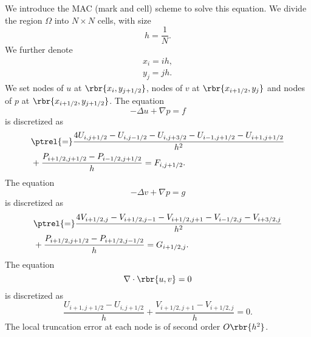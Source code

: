 \documentclass[english, nochinese]{pnote}
\begin{document}
We introduce the MAC (mark and cell) scheme to solve this equation. We divide the region $\Omega$ into $ N \times N $ cells, with size
\begin{equation}
h = \frac{1}{N}.
\end{equation}
We further denote
\begin{gather}
x_i = i h, \\
y_j = j h.
\end{gather}
We set nodes of $u$ at $ \rbr{ x_i, y_{ j + 1 / 2 } } $, nodes of $v$ at $ \rbr{ x_{ i + 1 / 2 }, y_j } $ and nodes of $p$ at $ \rbr{ x_{ i + 1 / 2 }, y_{ j + 1 / 2 } } $. The equation
\begin{equation}
-\Delta u + \nabla p = f
\end{equation}
is discretized as
\begin{equation} \label{Eq:LapU}
\begin{split}
&\ptrel{=} \frac{ 4 U_{ i, j + 1 / 2 } - U_{ i, j - 1 / 2 } - U_{ i, j + 3 / 2 } - U_{ i - 1, j + 1 / 2 } - U_{ i + 1, j + 1 / 2 } }{h^2} \\
&+ \frac{ P_{ i + 1 / 2, j + 1 / 2 } - P_{ i - 1 / 2, j + 1 / 2 } }{h} = F_{ i, j + 1 / 2 }.
\end{split}
\end{equation}
The equation
\begin{equation}
-\Delta v + \nabla p = g
\end{equation}
is discretized as
\begin{equation} \label{Eq:LapV}
\begin{split}
&\ptrel{=} \frac{ 4 V_{ i + 1 / 2, j } - V_{ i + 1 / 2, j - 1 } - V_{ i + 1 / 2, j + 1 } - V_{ i - 1 / 2, j } - V_{ i + 3 / 2 , j } }{h^2} \\
&+ \frac{ P_{ i + 1 / 2, j + 1 / 2 } - P_{ i + 1 / 2, j - 1 / 2 } }{h} = G_{ i + 1 / 2, j }.
\end{split}
\end{equation}
The equation
\begin{equation}
\nabla \cdot \rbr{ u, v } = 0
\end{equation}
is discretized as
\begin{equation}
\frac{ U_{ i + 1, j + 1 / 2 } - U_{ i, j + 1 / 2 } }{h} + \frac{ V_{ i + 1 / 2, j + 1 } - V_{ i + 1 / 2, j } }{h} = 0.
\end{equation}
The local truncation error at each node is of second order $ O \rbr{h^2} $.
\end{document}
